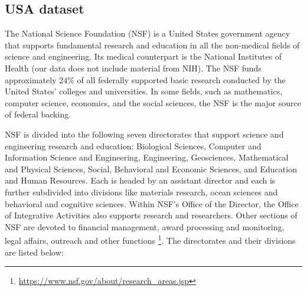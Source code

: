 \documentclass[12pt]{report}
\begin{document}
\subsection{USA dataset}

The National Science Foundation (NSF) is a United States government
agency that supports fundamental research and education in all the
non-medical fields of science and engineering. Its medical counterpart
is the National Institutes of Health (our data does not include 
material from NIH). The NSF funds approximately 24\% of all
federally supported basic research conducted by the United States'
colleges and universities. In some fields, such as mathematics,
computer science, economics, and the social sciences, the NSF is the
major source of federal backing.

NSF is divided into the following seven directorates that support science and
engineering research and education: Biological Sciences, Computer and
Information Science and Engineering, Engineering, Geosciences, Mathematical and
Physical Sciences, Social, Behavioral and Economic Sciences, and Education and
Human Resources. Each is headed by an assistant director and each is further
subdivided into divisions like materials research, ocean sciences and behavioral
and cognitive sciences. Within NSF's Office of the Director, the Office of
Integrative Activities also supports research and researchers. Other sections of
NSF are devoted to financial management, award processing and monitoring, legal
affairs, outreach and other functions \footnote{\url{https://www.nsf.gov/about/research_areas.jsp}}. The directorates and their divisions are listed below:
\end{document}
